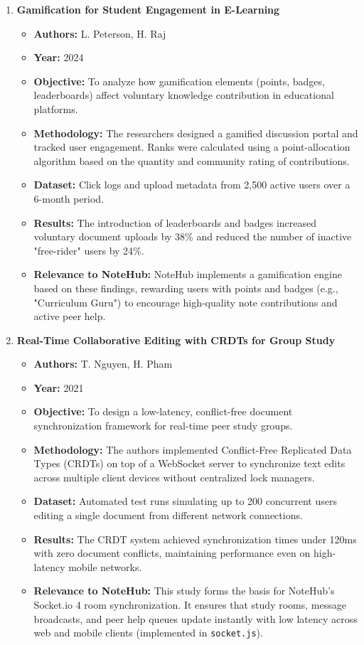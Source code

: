 \documentclass[12,Times new Roman,a4paper]{report}
\begin{document}
\begin{enumerate}
    \item \textbf{Gamification for Student Engagement in E-Learning}
    \begin{itemize}
        \item \textbf{Authors:} L. Peterson, H. Raj
        \item \textbf{Year:} 2024
        \item \textbf{Objective:} To analyze how gamification elements (points, badges, leaderboards) affect voluntary knowledge contribution in educational platforms.
        \item \textbf{Methodology:} The researchers designed a gamified discussion portal and tracked user engagement. Ranks were calculated using a point-allocation algorithm based on the quantity and community rating of contributions.
        \item \textbf{Dataset:} Click logs and upload metadata from 2,500 active users over a 6-month period.
        \item \textbf{Results:} The introduction of leaderboards and badges increased voluntary document uploads by 38\% and reduced the number of inactive "free-rider" users by 24\%.
        \item \textbf{Relevance to NoteHub:} NoteHub implements a gamification engine based on these findings, rewarding users with points and badges (e.g., "Curriculum Guru") to encourage high-quality note contributions and active peer help.
    \end{itemize}

    \item \textbf{Real-Time Collaborative Editing with CRDTs for Group Study}
    \begin{itemize}
        \item \textbf{Authors:} T. Nguyen, H. Pham
        \item \textbf{Year:} 2021
        \item \textbf{Objective:} To design a low-latency, conflict-free document synchronization framework for real-time peer study groups.
        \item \textbf{Methodology:} The authors implemented Conflict-Free Replicated Data Types (CRDTs) on top of a WebSocket server to synchronize text edits across multiple client devices without centralized lock managers.
        \item \textbf{Dataset:} Automated test runs simulating up to 200 concurrent users editing a single document from different network connections.
        \item \textbf{Results:} The CRDT system achieved synchronization times under 120ms with zero document conflicts, maintaining performance even on high-latency mobile networks.
        \item \textbf{Relevance to NoteHub:} This study forms the basis for NoteHub's Socket.io 4 room synchronization. It ensures that study rooms, message broadcasts, and peer help queues update instantly with low latency across web and mobile clients (implemented in \texttt{socket.js}).
    \end{itemize}


\end{enumerate}
\end{document}
